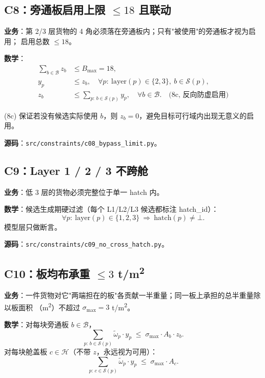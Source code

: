 \documentclass[a4paper,11pt]{ctexart}
\newcommand{\set}[1]{\mathcal{#1}}
\begin{document}
\subsection{C8：旁通板启用上限 $\leq 18$ 且联动}

\textbf{业务}：第 2/3 层货物的 4 角必须落在旁通板内；只有"被使用"的旁通板才视为启用；
启用总数 $\leq 18$。

\textbf{数学}：
\begin{align}
\sum_{b\in\set{B}} z_b &\leq B_{\max} = 18,\\
y_p &\leq z_b, \quad \forall p:\ \text{layer}(p)\in\{2,3\},\ b\in\set{S}(p),\\
z_b &\leq \sum_{p:\,b\in\set{S}(p)} y_p, \quad \forall b\in\set{B}.\quad\text{(8c, 反向防虚启用)}
\end{align}

(8c) 保证若没有候选实际使用 $b$，则 $z_b=0$，避免目标可行域内出现无意义的启用。

\textbf{源码}：\texttt{src/constraints/c08\_bypass\_limit.py}。

\subsection{C9：Layer 1 / 2 / 3 不跨舱}

\textbf{业务}：低 3 层的货物必须完整位于单一 hatch 内。

\textbf{数学}：候选生成期硬过滤（每个 L1/L2/L3 候选都标注 hatch\_id）：
\[
\forall p:\ \text{layer}(p)\in\{1,2,3\}\ \Rightarrow\ \text{hatch}(p)\neq\bot.
\]
模型层只做断言。

\textbf{源码}：\texttt{src/constraints/c09\_no\_cross\_hatch.py}。

\subsection{C10：板均布承重 $\leq 3$ t/m\textsuperscript{2}}

\textbf{业务}：一件货物对它"两端担在的板"各贡献一半重量；同一板上承担的总半重量除以板面积
（m\textsuperscript{2}）不超过 $\sigma_{\max}=3$ t/m\textsuperscript{2}。

\textbf{数学}：对每块旁通板 $b\in\set{B}$，
\begin{equation}
\sum_{p:\,b\in\set{S}(p)} \widetilde\omega_p \cdot y_p
\;\leq\; \sigma_{\max} \cdot A_b \cdot z_b.
\end{equation}
对每块舱盖板 $c\in\set{H}$（不带 $z$，永远视为可用）：
\begin{equation}
\sum_{p:\,c\in\set{S}(p)} \widetilde\omega_p \cdot y_p
\;\leq\; \sigma_{\max}\cdot A_c.
\end{equation}
\end{document}
